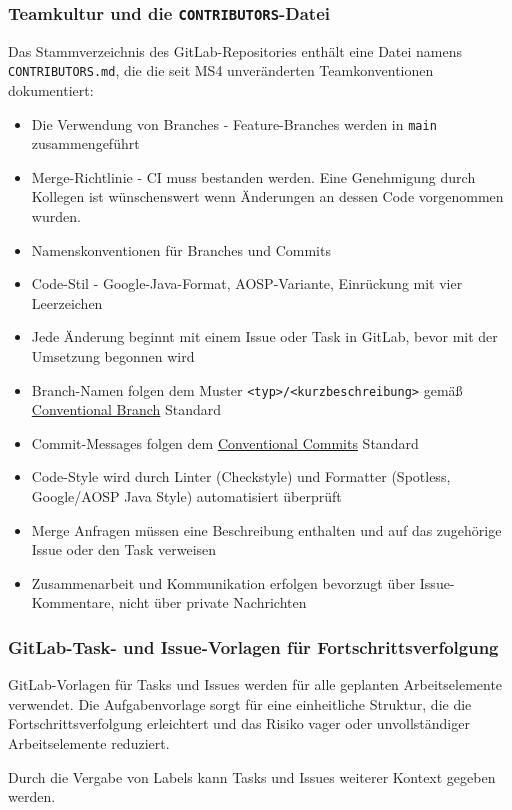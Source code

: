 \documentclass{article}
\begin{document}
\subsubsection{Teamkultur und die \texttt{CONTRIBUTORS}-Datei}
Das Stammverzeichnis des GitLab-Repositories enthält eine Datei namens \texttt{CONTRIBUTORS.md}, die die seit MS4 unveränderten Teamkonventionen dokumentiert:
\begin{itemize}
  \item Die Verwendung von Branches - Feature-Branches werden in \texttt{main} zusammengeführt
  \item Merge-Richtlinie - CI muss bestanden werden. Eine Genehmigung durch Kollegen ist wünschenswert wenn Änderungen an dessen Code vorgenommen wurden.
  \item Namenskonventionen für Branches und Commits
  \item Code-Stil - Google-Java-Format, AOSP-Variante, Einrückung mit vier Leerzeichen
  \item Jede Änderung beginnt mit einem Issue oder Task in GitLab, bevor mit der Umsetzung begonnen wird
  \item Branch-Namen folgen dem Muster \texttt{<typ>/<kurzbeschreibung>} gemäß \href{https://conventional-branch.github.io/}{Conventional Branch} Standard
  \item Commit-Messages folgen dem \href{https://www.conventionalcommits.org/en/v1.0.0/}{Conventional Commits} Standard
  \item Code-Style wird durch Linter (Checkstyle) und Formatter (Spotless, Google/AOSP Java Style) automatisiert überprüft
  \item Merge Anfragen müssen eine Beschreibung enthalten und auf das zugehörige Issue oder den Task verweisen
  \item Zusammenarbeit und Kommunikation erfolgen bevorzugt über Issue-Kommentare, nicht über private Nachrichten
\end{itemize}

\subsubsection{GitLab-Task- und Issue-Vorlagen für Fortschrittsverfolgung}
GitLab-Vorlagen für Tasks und Issues werden für alle geplanten Arbeitselemente verwendet. Die Aufgabenvorlage sorgt für eine einheitliche Struktur, die die Fortschrittsverfolgung erleichtert und das Risiko vager oder unvollständiger Arbeitselemente reduziert.

Durch die Vergabe von Labels kann Tasks und Issues weiterer Kontext gegeben werden.
\end{document}
